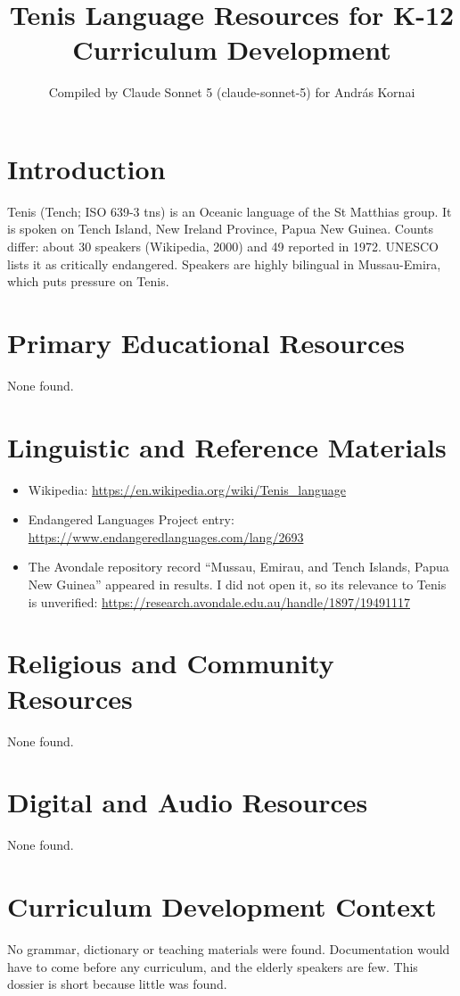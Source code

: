 \documentclass[12pt]{article}
\title{Tenis Language Resources for K-12 Curriculum Development}
\author{Compiled by Claude Sonnet 5 (claude-sonnet-5) for Andr\'as Kornai}
\date{}
\begin{document}
\maketitle

\section{Introduction}
Tenis (Tench; ISO 639-3 tns) is an Oceanic language of the St Matthias group. It is spoken on Tench Island, New Ireland Province, Papua New Guinea. Counts differ: about 30 speakers (Wikipedia, 2000) and 49 reported in 1972. UNESCO lists it as critically endangered. Speakers are highly bilingual in Mussau-Emira, which puts pressure on Tenis.

\section{Primary Educational Resources}
None found.

\section{Linguistic and Reference Materials}
\begin{itemize}
\item Wikipedia: \url{https://en.wikipedia.org/wiki/Tenis_language}
\item Endangered Languages Project entry: \url{https://www.endangeredlanguages.com/lang/2693}
\item The Avondale repository record ``Mussau, Emirau, and Tench Islands, Papua New Guinea'' appeared in results. I did not open it, so its relevance to Tenis is unverified: \url{https://research.avondale.edu.au/handle/1897/19491117}
\end{itemize}

\section{Religious and Community Resources}
None found.

\section{Digital and Audio Resources}
None found.

\section{Curriculum Development Context}
No grammar, dictionary or teaching materials were found. Documentation would have to come before any curriculum, and the elderly speakers are few. This dossier is short because little was found.
\end{document}
